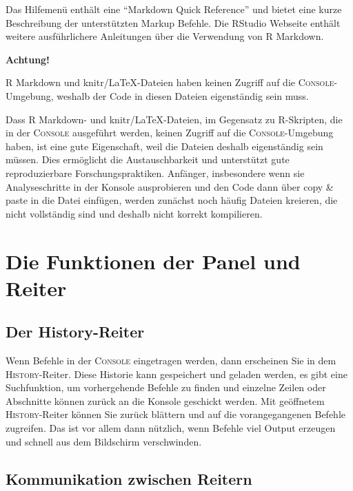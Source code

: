 \documentclass[
  ngerman,
]{scrbook}
\newenvironment{achtung}[1]
  {
  \begin{itemize}
  \renewcommand{\labelitemi}{
    \raisebox{1.8\height}[0pt][0pt]{
      {\setkeys{Gin}{width=7em,keepaspectratio}
        {\Large \textcolor{dark-fom-green}\faExclamationCircle}}
        }
  }
  \begin{blackbox}
        \bgroup\color{dark-fom-green}
          {\textbf{Achtung!}}
        \egroup
  \item
  }
  {
  \end{blackbox}
  \end{itemize}
  }
\begin{document}
Das Hilfemenü enthält eine ``Markdown Quick Reference'' und bietet eine kurze Beschreibung der unterstützten Markup Befehle. Die \textsf{RStudio} Webseite enthält weitere ausführlichere Anleitungen über die Verwendung von \textsf{R Markdown}.

\begin{achtung}{achtung}
\textsf{R Markdown} und \textsf{knitr/LaTeX}-Dateien haben keinen Zugriff auf die \textsc{Console}-Umgebung, weshalb der Code in diesen Dateien eigenständig sein muss.

\end{achtung}

Dass \textsf{R Markdown}- und \textsf{knitr/LaTeX}-Dateien, im Gegensatz zu \textsf{R}-Skripten, die in der \textsc{Console} ausgeführt werden, keinen Zugriff auf die \textsc{Console}-Umgebung haben, ist eine gute Eigenschaft, weil die Dateien deshalb eigenständig sein müssen. Dies ermöglicht die Austauschbarkeit und unterstützt gute reproduzierbare Forschungspraktiken. Anfänger, insbesondere wenn sie Analyseschritte in der Konsole ausprobieren und den Code dann über copy \& paste in die Datei einfügen, werden zunächst noch häufig Dateien kreieren, die nicht vollständig sind und deshalb nicht korrekt kompilieren.

\hypertarget{die-funktionen-der-panel-und-reiter}{%
\section{Die Funktionen der Panel und Reiter}\label{die-funktionen-der-panel-und-reiter}}

\hypertarget{der-history-reiter}{%
\subsection{Der History-Reiter}\label{der-history-reiter}}

Wenn Befehle in der \textsc{Console} eingetragen werden, dann erscheinen Sie in dem \textsc{History}-Reiter. Diese Historie kann gespeichert und geladen werden, es gibt eine Suchfunktion, um vorhergehende Befehle zu finden und einzelne Zeilen oder Abschnitte können zurück an die Konsole geschickt werden. Mit geöffnetem \textsc{History}-Reiter können Sie zurück blättern und auf die vorangegangenen Befehle zugreifen. Das ist vor allem dann nützlich, wenn Befehle viel Output erzeugen und schnell aus dem Bildschirm verschwinden.

\hypertarget{kommunikation-zwischen-reitern}{%
\subsection{Kommunikation zwischen Reitern}\label{kommunikation-zwischen-reitern}}
\end{document}
